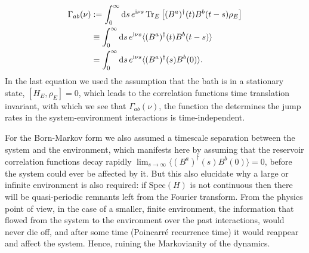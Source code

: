 \begin{equation}
    \label{eq:half-fourier-reservoir-corr-fn}
    \begin{split}
        \Gamma_{ab}(\nu) &:= \int_{0}^{\infty} \mathop{}\!\mathrm{d} s\, e^{\mathrm{i}\nu s} \operatorname{Tr}_E\left[(B^a)^\dagger(t)B^b(t-s)\rho_E\right] \\
        &\equiv \int_{0}^{\infty} \mathop{}\!\mathrm{d} s\,e^{\mathrm{i}\nu s}\langle (B^a)^\dagger(t)B^b(t-s) \rangle \\
        &= \int_{0}^{\infty} \mathop{}\!\mathrm{d} s\,e^{\mathrm{i}\nu s}\langle (B^a)^\dagger(s)B^b(0) \rangle.
    \end{split}
\end{equation}
In the last equation we used the assumption that the bath is in a stationary state, $[H_E, \rho_E] = 0$, which leads to the correlation functions time translation invariant, with which we see that $\Gamma_{ab}(\nu)$, the function the determines the jump rates in the system-environment interactions is time-independent. 

For the Born-Markov form we also assumed a timescale separation between the system and the environment, which manifests here by assuming that the reservoir correlation functions decay rapidly $\lim_{s\rightarrow\infty}\langle (B^a)^\dagger(s)B^b(0) \rangle = 0$, before the system could ever be affected by it. But this also elucidate why a large or infinite environment is also required: if $\mathrm{Spec}(H)$ is not continuous then there will be quasi-periodic remnants left from the Fourier transform. From the physics point of view, in the case of a smaller, finite environment, the information that flowed from the system to the environment over the past interactions, would never die off, and after some time (Poincarré recurrence time) it would reappear and affect the system. Hence, ruining the Markovianity of the dynamics.

